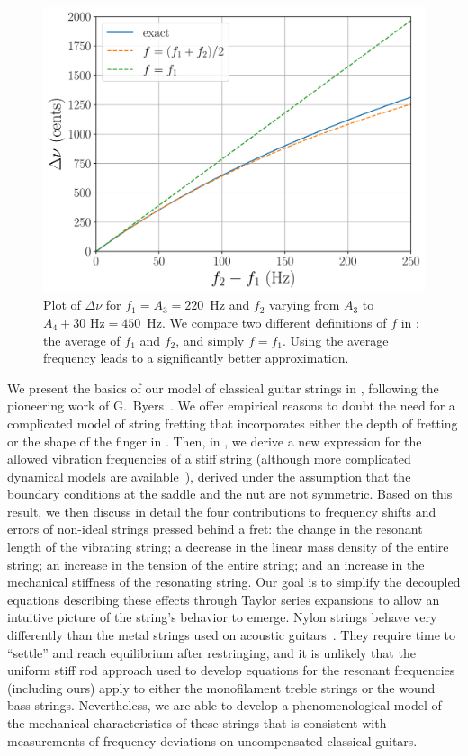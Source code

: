 \begin{figure}
    \centering
    \includegraphics[width=6.5in]{../figures/diff_pitch}
    \caption{\label{fig:diff_pitch} Plot of $\Delta \nu$ for $f_1 = A_3 = 220$~Hz and $f_2$ varying from $A_3$ to $A_4 + 30 \textrm{ Hz} = 450$~Hz. We compare two different definitions of $f$ in : the average of $f_1$ and $f_2$, and simply $f = f_1$. Using the average frequency leads to a significantly better approximation.}
\end{figure}
  
We present the basics of our model of classical guitar strings in , following the pioneering work of G.\ Byers~\cite{ref:byers1996cgi,ref:byersweb}. We offer empirical reasons to doubt the need for a complicated model of string fretting that incorporates either the depth of fretting or the shape of the finger in . Then, in , we derive a new expression for the allowed vibration frequencies of a stiff string (although more complicated dynamical models are available~\cite{ref:ducceschi2016lss}), derived  under the assumption that the boundary conditions at the saddle and the nut are not symmetric. Based on this result, we then discuss in detail the four contributions to frequency shifts and errors of non-ideal strings pressed behind a fret: the change in the resonant length of the vibrating string; a decrease in the linear mass density of the entire string; an increase in the tension of the entire string; and an increase in the mechanical stiffness of the resonating string. Our goal is to simplify the decoupled equations describing these effects through Taylor series expansions to allow an intuitive picture of the string's behavior to emerge. Nylon strings behave very differently than the metal strings used on acoustic guitars~\cite{ref:lynchaird2017mpn,ref:lynchaird2018cmp}. They require time to ``settle'' and reach equilibrium after restringing, and it is unlikely that the uniform stiff rod approach used to develop equations for the resonant frequencies (including ours) apply to either the monofilament treble strings or the wound bass strings. Nevertheless, we are able to develop a phenomenological model of the mechanical characteristics of these strings that is consistent with measurements of frequency deviations on uncompensated classical guitars.

